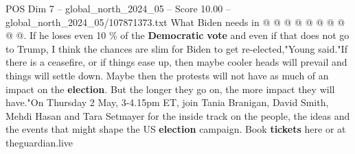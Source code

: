 \begin{textsample}{POS Dim 7 – global\_north\_2024\_05 – Score 10.00 – global\_north\_2024\_05/107871373.txt}
What Biden needs in @ @ @ @ @ @ @ @ @ @.
If he loses even 10 \% of the \textbf{Democratic} \textbf{vote} and even if that does not go to Trump, I think the chances are slim for Biden to get re-elected,"Young said."If there is a ceasefire, or if things ease up, then maybe cooler heads will prevail and things will settle down.
Maybe then the protests will not have as much of an impact on the \textbf{election}.
But the longer they go on, the more impact they will have."On Thursday 2 May, 3-4.15pm ET, join Tania Branigan, David Smith, Mehdi Hasan and Tara Setmayer for the inside track on the people, the ideas and the events that might shape the US \textbf{election} campaign.
Book \textbf{tickets} here or at theguardian.live

\end{textsample}
